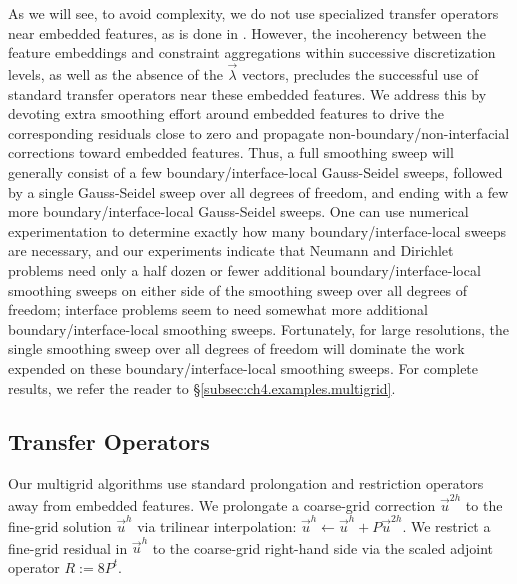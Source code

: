 As we will see, to avoid complexity, we do not use specialized transfer operators near embedded features, as is done in \cite{Adams.Loyce02, Adams.Loyce04, Adams.Loyce05, Chen08, Wan.Justin04}. However, the incoherency between the feature embeddings and constraint aggregations within successive discretization levels, as well as the absence of the $\vec{\lambda}$ vectors, precludes the successful use of standard transfer operators near these embedded features. We address this by devoting extra smoothing effort around embedded features to drive the corresponding residuals close to zero and propagate non-boundary/non-interfacial corrections toward embedded features. Thus, a full smoothing sweep will generally consist of a few boundary/interface-local Gauss-Seidel sweeps, followed by a single Gauss-Seidel sweep over all degrees of freedom, and ending with a few more boundary/interface-local Gauss-Seidel sweeps. One can use numerical experimentation to determine exactly how many boundary/interface-local sweeps are necessary, and our experiments indicate that Neumann and Dirichlet problems need only a half dozen or fewer additional boundary/interface-local smoothing sweeps on either side of the smoothing sweep over all degrees of freedom; interface problems seem to need somewhat more additional boundary/interface-local smoothing sweeps. Fortunately, for large resolutions, the single smoothing sweep over all degrees of freedom will dominate the work expended on these boundary/interface-local smoothing sweeps. For complete results, we refer the reader to \S\ref{subsec:ch4.examples.multigrid}.

\subsection{Transfer Operators} \label{subsec:ch4.multigrid.transferoperators}

Our multigrid algorithms use standard prolongation and restriction operators away from embedded features. We prolongate a coarse-grid correction $\vec{u}^{2h}$ to the fine-grid solution $\vec{u}^h$ via trilinear interpolation: $\vec{u}^h \leftarrow \vec{u}^h + P \vec{u}^{2h}$. We restrict a fine-grid residual in $\vec{u}^h$ to the coarse-grid right-hand side via the scaled adjoint operator $R := 8 P^t$.

